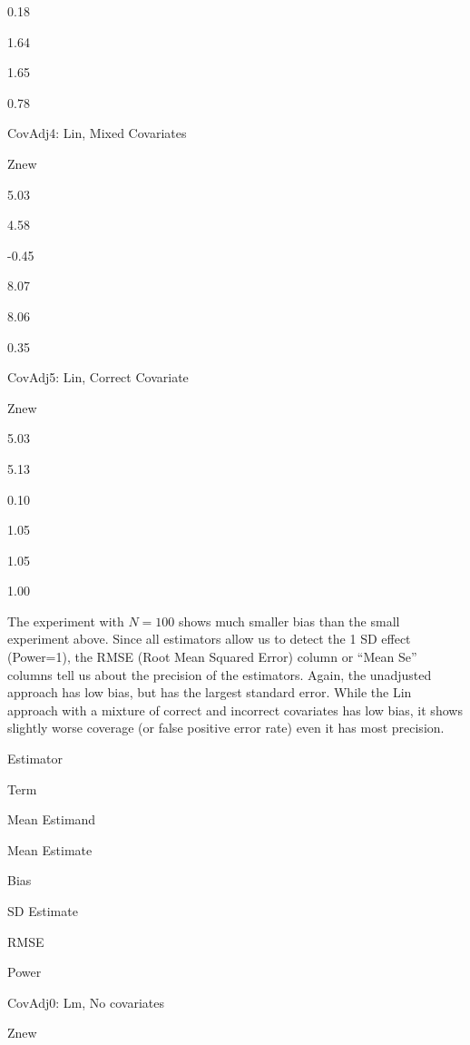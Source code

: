 \documentclass[
  12pt,
]{book}
\newenvironment{Shaded}{\begin{snugshade}}{\end{snugshade}}
\newcommand{\CommentTok}[1]{\textcolor[rgb]{0.56,0.35,0.01}{\textit{#1}}}
\newcommand{\KeywordTok}[1]{\textcolor[rgb]{0.13,0.29,0.53}{\textbf{#1}}}
\newcommand{\NormalTok}[1]{#1}
\theoremstyle{definition}
\theoremstyle{definition}
\theoremstyle{definition}
\theoremstyle{remark}
\begin{document}
0.18

1.64

1.65

0.78

CovAdj4: Lin, Mixed Covariates

Znew

5.03

4.58

-0.45

8.07

8.06

0.35

CovAdj5: Lin, Correct Covariate

Znew

5.03

5.13

0.10

1.05

1.05

1.00

The experiment with \(N=100\) shows much smaller bias than the small
experiment above. Since all estimators allow us to detect the 1 SD
effect (Power=1), the RMSE (Root Mean Squared Error) column or ``Mean
Se'' columns tell us about the precision of the estimators. Again, the
unadjusted approach has low bias, but has the largest standard error.
While the Lin approach with a mixture of correct and incorrect
covariates has low bias, it shows slightly worse coverage (or false
positive error rate) even it has most precision.

\begin{Shaded}
\end{Shaded}

Estimator

Term

Mean Estimand

Mean Estimate

Bias

SD Estimate

RMSE

Power

CovAdj0: Lm, No covariates

Znew
\end{document}
